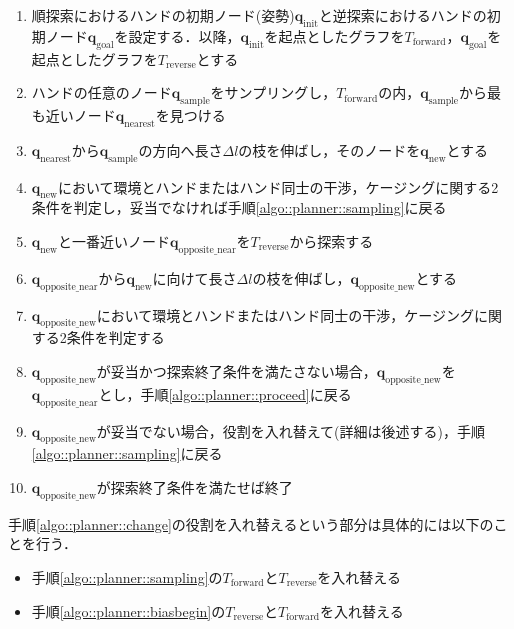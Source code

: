 \documentclass[a4paper,twoside,12pt,papersize, dvipdfmx]{iirthesis}
\begin{document}
\begin{enumerate}
\item 順探索におけるハンドの初期ノード(姿勢)$\bm{q}_{\mathrm {init}}$と逆探索におけるハンドの初期ノード$\bm{q}_{\mathrm {goal}}$を設定する．以降，$\bm{q}_{\mathrm {init}}$を起点としたグラフを$T_{\mathrm {forward}}$，$\bm{q}_{\mathrm {goal}}$を起点としたグラフを$T_{\mathrm {reverse}}$とする
\item ハンドの任意のノード$\bm{q}_{\mathrm {sample}}$をサンプリングし，$T_{\mathrm {forward}}$の内，$\bm{q}_{\mathrm{sample}}$から最も近いノード$\bm{q}_{\mathrm{nearest}}$を見つける\label{algo::planner::sampling}
\item $\bm{q}_{\mathrm{nearest}}$から$\bm{q}_{\mathrm{sample}}$の方向へ長さ$\Delta l$の枝を伸ばし，そのノードを$\bm{q}_{\mathrm{new}}$とする \label{algo::planner::qnew}
\item $\bm{q}_{\mathrm{new}}$において環境とハンドまたはハンド同士の干渉，ケージングに関する2条件を判定し，妥当でなければ手順\ref{algo::planner::sampling}に戻る
\item $\bm{q}_{\mathrm{new}}$と一番近いノード$\bm{q}_{\mathrm{opposite\_near}}$を$T_{\mathrm {reverse}}$から探索する\label{algo::planner::biasbegin}
\item $\bm{q}_{\mathrm{opposite\_near}}$から$\bm{q}_{\mathrm{new}}$に向けて長さ$\Delta l$の枝を伸ばし，$\bm{q}_{\mathrm{opposite\_new}}$とする\label{algo::planner::proceed}
\item $\bm{q}_{\mathrm{opposite\_new}}$において環境とハンドまたはハンド同士の干渉，ケージングに関する2条件を判定する
\item $\bm{q}_{\mathrm{opposite\_new}}$が妥当かつ探索終了条件を満たさない場合，$\bm{q}_{\mathrm{opposite\_new}}$を$\bm{q}_{\mathrm{opposite\_near}}$とし，手順\ref{algo::planner::proceed}に戻る\label{algo::planner::biasend}
\item $\bm{q}_{\mathrm{opposite\_new}}$が妥当でない場合，役割を入れ替えて(詳細は後述する)，手順\ref{algo::planner::sampling}に戻る \label{algo::planner::change}
\item $\bm{q}_{\mathrm{opposite\_new}}$が探索終了条件を満たせば終了\label{algo::planner::goalcond}
\end{enumerate}

手順\ref{algo::planner::change}の役割を入れ替えるという部分は具体的には以下のことを行う．
\begin{itemize}
\item 手順\ref{algo::planner::sampling}の$T_{\mathrm {forward}}$と$T_{\mathrm {reverse}}$を入れ替える
\item 手順\ref{algo::planner::biasbegin}の$T_{\mathrm {reverse}}$と$T_{\mathrm {forward}}$を入れ替える
\end{itemize}
\end{document}
